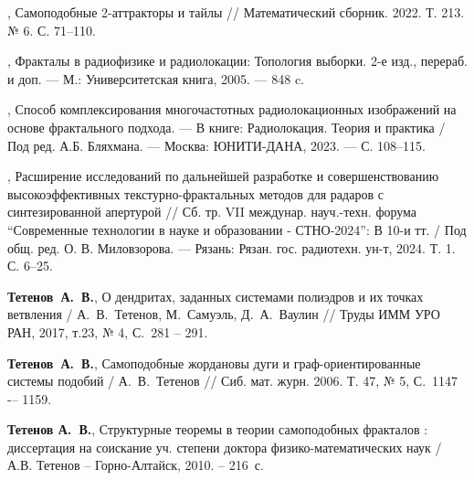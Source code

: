 \begin{thebibliography}{99}
,
Самоподобные 2-аттракторы и тайлы // Математический сборник. 2022. Т. 213. № 6. С. 71--110.

, 
Фракталы в радиофизике и радиолокации: Топология выборки. 
2-е изд., перераб. и доп. --- М.: Университетская книга, 2005. --- 848 c.

,
Способ комплексирования многочастотных радиолокационных изображений на основе фрактального подхода. --- В книге: Радиолокация. Теория и практика / Под ред. А.Б. Бляхмана. --- Москва: ЮНИТИ-ДАНА, 2023. --- С. 108--115. 

, 
Расширение исследований по дальнейшей разработке и совершенствованию высокоэффективных текстурно-фрактальных методов для радаров с синтезированной апертурой // 
Сб. тр. VII междунар. науч.-техн. форума “Современные технологии в науке и образовании - СТНО-2024”: В 10-и тт. / Под общ. ред. О. В. Миловзорова. --- Рязань: Рязан. гос. радиотехн. ун-т, 2024. Т. 1. С. 6--25.

{\bf Тетенов~А.~В.},  
О дендритах, заданных системами полиэдров и их точках ветвления /
А.~В.~Тетенов, М.~Самуэль, Д.~А.~Ваулин // 
Труды ИММ УРО РАН, 2017, т.23, № 4, С.~281 -- 291.

{\bf Тетенов~А.~В.},
Самоподобные жордановы дуги и граф-ориентированные системы подобий /
А.~В.~Тетенов //
Сиб. мат. журн. 2006. Т. 47, № 5, С.~1147 -– 1159.

{\bf Тетенов А.~В.}, 
Структурные теоремы в теории самоподобных фракталов : диссертация на соискание уч. степени доктора физико-математических наук / А.В. Тетенов -- Горно-Алтайск, 2010. -- 216~с. 


%





\end{thebibliography}
